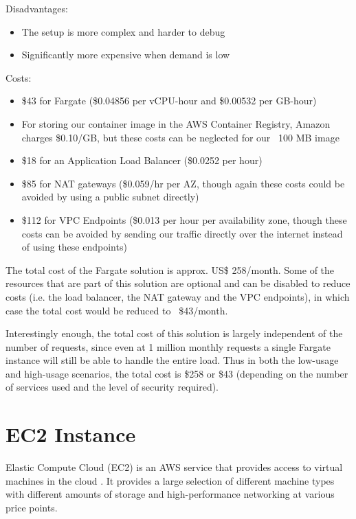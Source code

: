 Disadvantages:
\begin{itemize}
\item The setup is more complex and harder to debug
\item Significantly more expensive when demand is low
\end{itemize}

Costs:
\begin{itemize}
\item \$43 for Fargate (\$0.04856 per vCPU-hour and \$0.00532 per GB-hour)
\item For storing our container image in the AWS Container Registry, Amazon charges \$0.10/GB, but these costs can be neglected for our ~100 MB image
\item \$18 for an Application Load Balancer (\$0.0252 per hour)
\item \$85 for NAT gateways (\$0.059/hr per AZ, though again these costs could be avoided by using a public subnet directly)
\item \$112 for VPC Endpoints (\$0.013 per hour per availability zone, though these costs can be avoided by sending our traffic directly over the internet instead of using these endpoints)
\end{itemize}

The total cost of the Fargate solution is approx. US\$ 258/month. Some of the resources that are part of this solution are optional and can be disabled to reduce costs (i.e. the load balancer, the NAT gateway and the VPC endpoints), in which case the total cost would be reduced to ~\$43/month.

Interestingly enough, the total cost of this solution is largely independent of the number of requests, since even at 1 million monthly requests a single Fargate instance will still be able to handle the entire load. Thus in both the low-usage and high-usage scenarios, the total cost is \$258 or \$43 (depending on the number of services used and the level of security required).

\section{EC2 Instance}

Elastic Compute Cloud (EC2) is an AWS service that provides access to virtual machines in the cloud \cite{amazon-2022C}. It provides a large selection of different machine types with different amounts of storage and high-performance networking at various price points.

